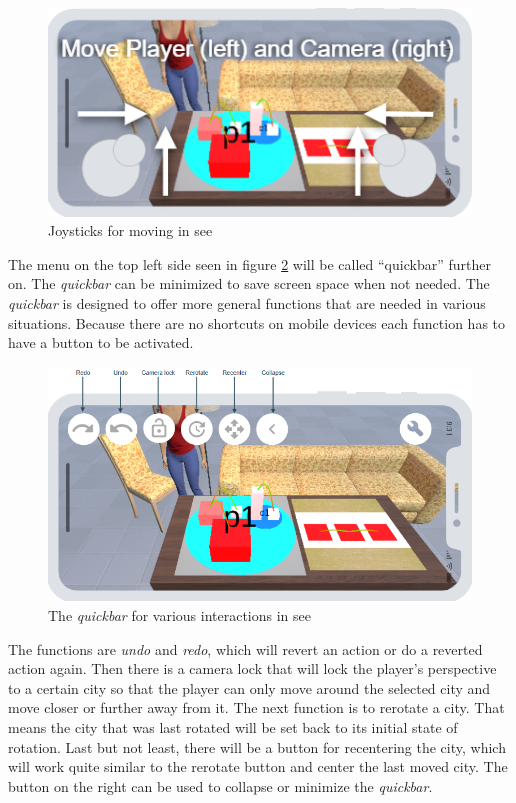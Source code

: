 \begin{figure}[htb]
    \centering
    \includegraphics[width=1\textwidth]{Concept/img/joystick.png}
    \caption{Joysticks for moving in \gls{see}}\label{fig:joystick_prototype}
\end{figure}

The menu on the top left side seen in figure \ref{fig:quickbar} will be called \enquote{quickbar} further on. 
The \textit{quickbar} can be minimized to save screen space when not needed. 
The \textit{quickbar} is designed to offer more general functions that are needed in various situations.
Because there are no shortcuts on mobile devices each function has to have a button to be activated.

\begin{figure}[htb]
    \centering
    \includegraphics[width=1\textwidth]{Concept/img/quickbar.png}
    \caption{The \textit{quickbar} for various interactions in \gls{see}}\label{fig:quickbar}
\end{figure}

The functions are \textit{undo} and \textit{redo}, which will revert an action or do a reverted action again.
Then there is a camera lock that will lock the player's perspective to a certain \gls{city} so that the player can only move around the selected city and move closer or further away from it.
The next function is to rerotate a \gls{city}.
That means the \gls{city} that was last rotated will be set back to its initial state of rotation.
Last but not least, there will be a button for recentering the city, which will work quite similar to the rerotate button and center the last moved \gls{city}.
The button on the right can be used to collapse or minimize the \textit{quickbar}.

